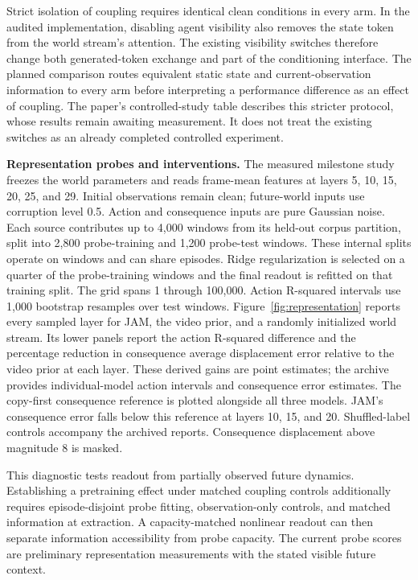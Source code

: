 Strict isolation of coupling requires identical clean conditions in every arm. In the audited
implementation, disabling agent visibility also removes the state token from the world stream's
attention. The existing visibility switches therefore change both generated-token exchange and part
of the conditioning interface. The planned comparison routes equivalent static state and
current-observation information to every arm before interpreting a performance difference as an
effect of coupling. The paper's controlled-study table describes this stricter protocol, whose results remain
awaiting measurement. It does not treat the existing switches as an already completed controlled
experiment.

\textbf{Representation probes and interventions.}
The measured milestone study freezes the world parameters and reads frame-mean features at layers
5, 10, 15, 20, 25, and 29. Initial observations remain clean; future-world inputs use corruption
level 0.5. Action and consequence inputs are pure Gaussian noise. Each source contributes up to
4,000 windows from its held-out corpus partition, split into 2,800 probe-training and 1,200
probe-test windows. These internal splits operate on windows and can share episodes. Ridge
regularization is selected on a quarter of the probe-training windows and the final readout is
refitted on that training split. The grid spans 1 through 100,000. Action R-squared intervals use
1,000 bootstrap resamples over test windows. Figure~\ref{fig:representation} reports every sampled
layer for JAM, the video prior, and a randomly initialized world stream. Its lower panels report
the action R-squared difference and the percentage reduction in consequence average displacement
error relative to the video prior at each layer. These derived gains are point estimates;
the archive provides individual-model action intervals and consequence error estimates.
The copy-first consequence reference is plotted alongside all three models. JAM's consequence
error falls below this reference at layers 10, 15, and 20. Shuffled-label controls accompany the
archived reports. Consequence displacement above magnitude 8 is masked.

This diagnostic tests readout from partially observed future dynamics. Establishing a pretraining
effect under matched coupling controls additionally requires episode-disjoint probe fitting,
observation-only controls, and matched information at extraction. A capacity-matched nonlinear
readout can then separate information accessibility from probe capacity. The current probe scores
are preliminary representation measurements with the stated visible future context.

